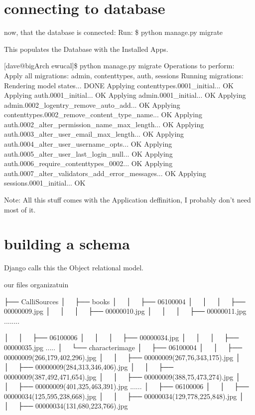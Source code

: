 \section{connecting to database}


now, that the database is connected:  Run:  \$ python manage.py migrate

This populates the Database with the Installed Apps.

[dave@bigArch ewucal]\$ python manage.py migrate
Operations to perform:
  Apply all migrations: admin, contenttypes, auth, sessions
Running migrations:
  Rendering model states... DONE
  Applying contenttypes.0001_initial... OK
  Applying auth.0001_initial... OK
  Applying admin.0001_initial... OK
  Applying admin.0002_logentry_remove_auto_add... OK
  Applying contenttypes.0002_remove_content_type_name... OK
  Applying auth.0002_alter_permission_name_max_length... OK
  Applying auth.0003_alter_user_email_max_length... OK
  Applying auth.0004_alter_user_username_opts... OK
  Applying auth.0005_alter_user_last_login_null... OK
  Applying auth.0006_require_contenttypes_0002... OK
  Applying auth.0007_alter_validators_add_error_messages... OK
  Applying sessions.0001_initial... OK

  
  Note:  All this stuff comes with the Application deffinition, I probably don't need most of it.
  
  
  
  
  
  
\section{building a schema}

Django calls this the Object relational model.

our files organizatuin

├── CalliSources
│   ├── books
│   │   ├── 06100004
│   │   │   ├── 00000009.jpg
│   │   │   ├── 00000010.jpg
│   │   │   ├── 00000011.jpg
........

│   │   ├── 06100006
│   │   │   ├── 00000034.jpg
│   │   │   ├── 00000035.jpg
.....
│   └── characterimage
│       ├── 06100004
│       │   ├── 00000009(266,179,402,296).jpg
│       │   ├── 00000009(267,76,343,175).jpg
│       │   ├── 00000009(284,313,346,406).jpg
│       │   ├── 00000009(387,492,471,654).jpg
│       │   ├── 00000009(388,75,473,274).jpg
│       │   ├── 00000009(401,325,463,391).jpg
......
│       ├── 06100006
│       │   ├── 00000034(125,595,238,668).jpg
│       │   ├── 00000034(129,778,225,848).jpg
│       │   ├── 00000034(131,680,223,766).jpg




